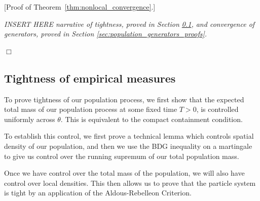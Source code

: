 \documentclass[12pt]{article}
\newenvironment {proof}{{\noindent\bf Proof }}{\hfill $\Box$ \medskip}
\newcommand{\comment}[1]{{\color{blue} \it #1}}
\begin{document}
\begin{proof}[Proof of Theorem~\ref{thm:nonlocal_convergence}.]

\comment{INSERT HERE
    narrative of tightness,
    proved in Section \ref{sec:population_tightness_proofs},
    and convergence of generators,
    proved in Section \ref{sec:population_generators_proofs}.
}

\end{proof}


\subsection{Tightness of empirical measures}
    \label{sec:population_tightness_proofs}
To prove tightness of our population process, 
we first show that the expected total mass of our population process at some fixed time $T>0$,
is controlled uniformly across $\theta$.
This is equivalent to the compact containment condition.

To establish this control,
we first prove a technical lemma which controls spatial density of our population,
and then we use the BDG inequality on a martingale
to give us control over the running supremum of our total population mass.

Once we have control over the total mass of the population, 
we will also have control over local densities.
This then allows us to prove that the particle system is tight
by an application of the Aldous-Rebelleon Criterion.
\end{document}
